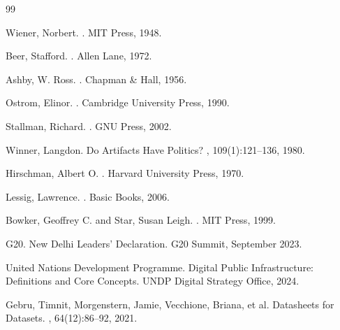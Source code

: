 \documentclass{article}
\begin{document}

\begin{thebibliography}{99}

Wiener, Norbert.
.
\newblock MIT Press, 1948.

Beer, Stafford.
.
\newblock Allen Lane, 1972.

Ashby, W. Ross.
.
\newblock Chapman \& Hall, 1956.

Ostrom, Elinor.
.
\newblock Cambridge University Press, 1990.

Stallman, Richard.
.
\newblock GNU Press, 2002.

Winner, Langdon.
\newblock Do Artifacts Have Politics?
, 109(1):121--136, 1980.

Hirschman, Albert O.
.
\newblock Harvard University Press, 1970.

Lessig, Lawrence.
.
\newblock Basic Books, 2006.

Bowker, Geoffrey C. and Star, Susan Leigh.
.
\newblock MIT Press, 1999.

G20.
\newblock New Delhi Leaders' Declaration.
\newblock G20 Summit, September 2023.

United Nations Development Programme.
\newblock Digital Public Infrastructure: Definitions and Core Concepts.
\newblock UNDP Digital Strategy Office, 2024.

Gebru, Timnit, Morgenstern, Jamie, Vecchione, Briana, et al.
\newblock Datasheets for Datasets.
, 64(12):86--92, 2021.


\end{thebibliography}
\end{document}
